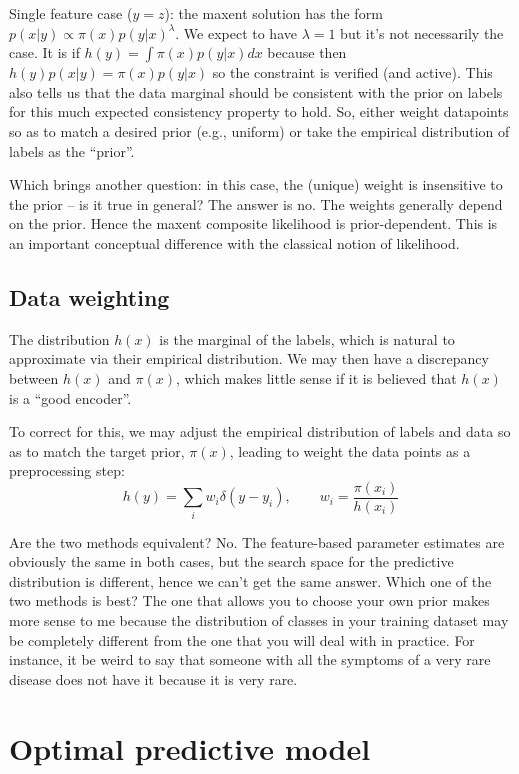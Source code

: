 \documentclass[english]{scrartcl}
\begin{document}
Single feature case ($y=z$): the maxent solution has the form $p(x|y)\propto\pi(x)p(y|x)^\lambda$. We expect to have $\lambda=1$ but it's not necessarily the case. It is if $h(y)=\int\pi(x)p(y|x)dx$ because then $h(y)p(x|y)=\pi(x)p(y|x)$ so the constraint is verified (and active). This also tells us that the data marginal should be consistent with the prior on labels for this much expected consistency property to hold. So, either weight datapoints so as to match a desired prior (e.g., uniform) or take the empirical distribution of labels as the ``prior''. 

Which brings another question: in this case, the (unique) weight is insensitive to the prior -- is it true in general? The answer is no. The weights generally depend on the prior. Hence the maxent composite likelihood is prior-dependent. This is an important conceptual difference with the classical notion of likelihood.




\subsection{Data weighting}

The distribution $h(x)$ is the marginal of the labels, which is natural to approximate via their empirical distribution. We may then have a discrepancy between $h(x)$ and $\pi(x)$, which makes little sense if it is believed that $h(x)$ is a ``good encoder''. 

To correct for this, we may adjust the empirical distribution of labels and data so as to match the target prior, $\pi(x)$, leading to weight the data points as a preprocessing step:
$$
h(y) = \sum_i w_i \delta(y-y_i),
\qquad
w_i = \frac{\pi(x_i)}{h(x_i)}
$$

Are the two methods equivalent? No. The feature-based parameter estimates are obviously the same in both cases, but the search space for the predictive distribution is different, hence we can't get the same answer. Which one of the two methods is best? The one that allows you to choose your own prior makes more sense to me because the distribution of classes in your training dataset may be completely different from the one that you will deal with in practice. For instance, it be weird to say that someone with all the symptoms of a very rare disease does not have it because it is very rare. 


\section{Optimal predictive model}
\end{document}
